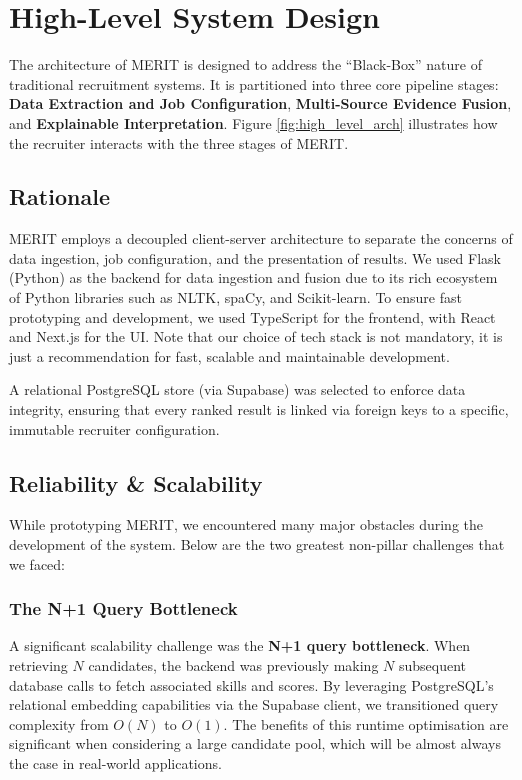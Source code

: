 
\section{High-Level System Design}
The architecture of MERIT is designed to address the ``Black-Box'' nature of traditional
recruitment systems. It is partitioned into three core pipeline stages:
\textbf{Data Extraction and Job Configuration}, \textbf{Multi-Source Evidence Fusion}, and
\textbf{Explainable Interpretation}. Figure \ref{fig:high_level_arch} illustrates how
the recruiter interacts with the three stages of MERIT.



\subsection{Rationale}
MERIT employs a decoupled client-server architecture to separate the
concerns of data ingestion, job configuration, and the presentation of results.
We used Flask (Python) as the backend for data ingestion and fusion due to its rich ecosystem
of Python libraries such as NLTK, spaCy, and Scikit-learn.
To ensure fast prototyping and development, we used TypeScript for the frontend, 
with React and Next.js for the UI. Note that our choice of tech stack is not mandatory, it is 
just a recommendation for fast, scalable and maintainable development.

A relational PostgreSQL store (via Supabase) was selected to enforce data integrity,
ensuring that every ranked result is linked via foreign keys to a specific,
immutable recruiter configuration.

\subsection{Reliability \& Scalability}
While prototyping MERIT, we encountered many major obstacles
during the development of the system. Below are the two 
greatest non-pillar challenges that we faced:

\subsubsection{The N+1 Query Bottleneck}
A significant scalability challenge was the \textbf{N+1 query bottleneck}. When
retrieving $N$ candidates, the backend was previously making $N$ subsequent database
calls to fetch associated skills and scores. By leveraging PostgreSQL's relational
embedding capabilities via the Supabase client, we transitioned query complexity from
$O(N)$ to $O(1)$. The benefits of this runtime optimisation are significant when considering
a large candidate pool, which will be almost always the case in real-world
applications.

